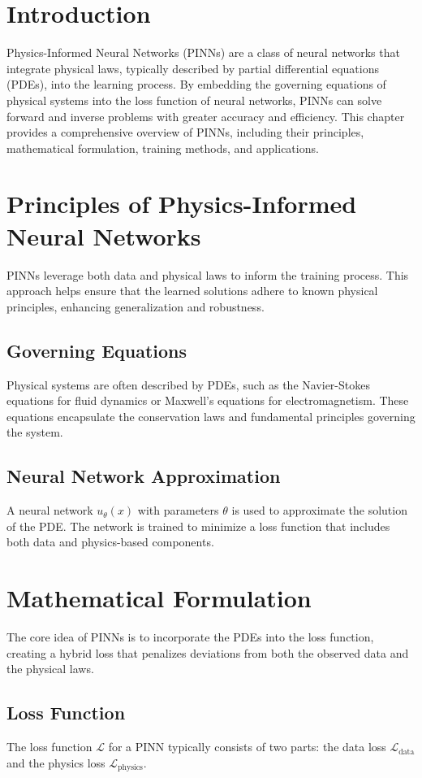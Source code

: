 \section{Introduction}
Physics-Informed Neural Networks (PINNs) are a class of neural networks that integrate physical laws, typically described by partial differential equations (PDEs), into the learning process. By embedding the governing equations of physical systems into the loss function of neural networks, PINNs can solve forward and inverse problems with greater accuracy and efficiency. This chapter provides a comprehensive overview of PINNs, including their principles, mathematical formulation, training methods, and applications.

\section{Principles of Physics-Informed Neural Networks}
PINNs leverage both data and physical laws to inform the training process. This approach helps ensure that the learned solutions adhere to known physical principles, enhancing generalization and robustness.

\subsection{Governing Equations}
Physical systems are often described by PDEs, such as the Navier-Stokes equations for fluid dynamics or Maxwell's equations for electromagnetism. These equations encapsulate the conservation laws and fundamental principles governing the system.

\subsection{Neural Network Approximation}
A neural network \( u_\theta(x) \) with parameters \( \theta \) is used to approximate the solution of the PDE. The network is trained to minimize a loss function that includes both data and physics-based components.

\section{Mathematical Formulation}
The core idea of PINNs is to incorporate the PDEs into the loss function, creating a hybrid loss that penalizes deviations from both the observed data and the physical laws.

\subsection{Loss Function}
The loss function \( \mathcal{L} \) for a PINN typically consists of two parts: the data loss \( \mathcal{L}_\text{data} \) and the physics loss \( \mathcal{L}_\text{physics} \).

